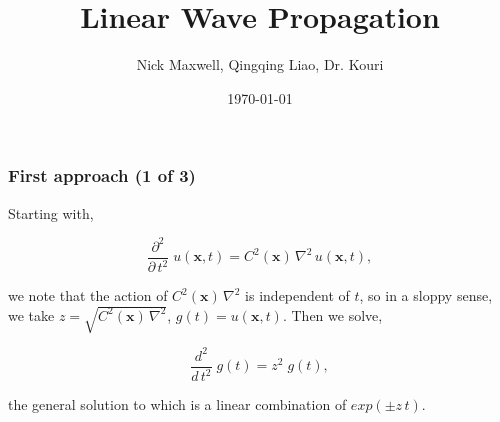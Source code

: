 \documentclass{beamer}
\title{Linear Wave Propagation}
\author{Nick Maxwell, Qingqing Liao, Dr. Kouri}
\date{\today}
\begin{document}
\frame{\titlepage}







\section[First approach ]{}

\begin{frame}
\frametitle{First approach (1 of 3)}	
\begin{flushleft}
Starting with,
\end{flushleft}
\begin{equation*}
\frac{ \partial^2 }{ \partial \, t^2} \; u(\mathbf{x},t)  = C^2(\mathbf{x}) \, \nabla^2 \, u(\mathbf{x},t),
\end{equation*}
\begin{flushleft}
we note that the action of $C^2(\mathbf{x}) \, \nabla^2$ is independent of $t$, so in a sloppy sense, we take $z = \sqrt{C^2(\mathbf{x}) \, \nabla^2}$, $g(t) = u(\mathbf{x},t)$. Then we solve,
\end{flushleft}
\begin{equation*}
\frac{ d^2 }{ d \, t^2} \; g(t)  = z^2 \; g(t),
\end{equation*}
\begin{flushleft}
the general solution to which is a linear combination of $exp(\pm z \, t)$.
\end{flushleft}
\end{frame}
\end{document}
